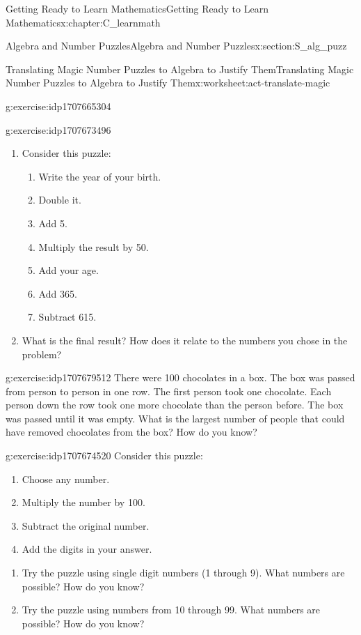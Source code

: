\documentclass[oneside,10pt,]{book}
\numberwithin{equation}{chapter}
\begin{document}
\begin{chapterptx}{Getting Ready to Learn Mathematics}{}{Getting Ready to Learn Mathematics}{}{}{x:chapter:C_learnmath}
\begin{sectionptx}{Algebra and Number Puzzles}{}{Algebra and Number Puzzles}{}{}{x:section:S_alg_puzz}
\begin{worksheet-subsection}{Translating Magic Number Puzzles to Algebra to Justify Them}{}{Translating Magic Number Puzzles to Algebra to Justify Them}{}{}{x:worksheet:act-translate-magic}
\begin{divisionexercise}{3}{}{}{g:exercise:idp1707665304}
\end{divisionexercise}%
\begin{divisionexercise}{4}{}{}{g:exercise:idp1707673496}%
\begin{enumerate}[font=\bfseries,label=(\alph*),ref=\alph*]
\item{}Consider this puzzle:%
\begin{enumerate}[label=(\alph*)]
\item{}Write the year of your birth.%
\item{}Double it.%
\item{}Add 5.%
\item{}Multiply the result by 50.%
\item{}Add your age.%
\item{}Add 365.%
\item{}Subtract 615.%
\end{enumerate}
%
\item{}What is the final result? How does it relate to the numbers you chose in the problem?%
\end{enumerate}
\end{divisionexercise}%
\begin{divisionexercise}{5}{}{}{g:exercise:idp1707679512}%
There were 100 chocolates in a box. The box was passed from person to person in one row. The first person took one chocolate. Each person down the row took one more chocolate than the person before. The box was passed until it was empty. What is the largest number of people that could have removed chocolates from the box? How do you know?%
\end{divisionexercise}%
\begin{divisionexercise}{6}{}{}{g:exercise:idp1707674520}%
Consider this puzzle:%
\begin{enumerate}[label=(\alph*)]
\item{}Choose any number.%
\item{}Multiply the number by 100.%
\item{}Subtract the original number.%
\item{}Add the digits in your answer.%
\end{enumerate}
%
\begin{enumerate}[font=\bfseries,label=(\alph*),ref=\alph*]
\item{}Try the puzzle using single digit numbers (1 through 9). What numbers are possible? How do you know?%
\item{}Try the puzzle using numbers from 10 through 99. What numbers are possible? How do you know?%

\end{enumerate}
\end{divisionexercise}
\end{worksheet-subsection}
\end{sectionptx}
\end{chapterptx}
\end{document}

